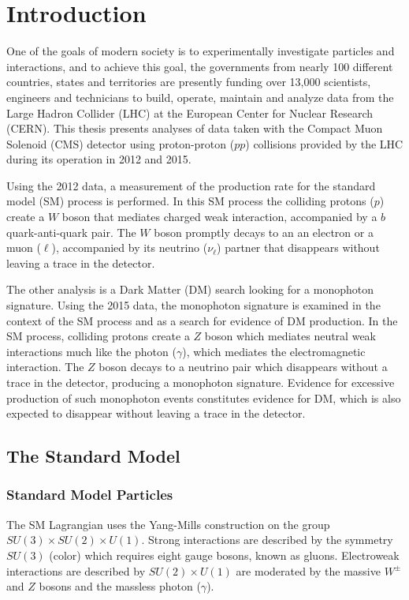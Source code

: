 
\chapter{Introduction}\label{sec:introduction}

 One of the goals of modern society is
  to experimentally investigate particles and
  interactions, and 
  to achieve this goal, the governments from 
  nearly 100 %
  different countries, states and territories are
  presently funding over 13,000 scientists, engineers 
  and technicians to build, operate, maintain 
  and analyze data from the
  Large Hadron Collider (LHC)
  at the European Center for Nuclear Research (CERN).
 This thesis presents analyses of data taken
  with the Compact Muon Solenoid (CMS) detector
  using proton-proton ($pp$) collisions provided by the LHC
  during its operation in 2012 and 2015.

 Using the 2012 data, a measurement of the
  production rate for the 
  standard model (SM) process \ppwbblnbb
  is performed. 
 In this SM process the colliding protons ($p$) create a
  $W$ boson that mediates charged weak interaction,
  accompanied by a $b$
  quark-anti-quark pair. 
 The $W$ boson promptly decays to an an electron
  or a muon ($\ell$), 
  accompanied by its neutrino ($\nu_\ell$) partner
  that disappears without leaving
  a trace in the detector.

 The other analysis is a Dark Matter (DM)
  search looking for a monophoton signature.
 Using the 2015 data,
  the monophoton signature is examined in the context
  of the SM process \ppzgnng  and as a search for evidence of
  DM production.
 In the SM process, colliding
  protons create a $Z$ boson which mediates
  neutral weak interactions much
  like the photon ($\gamma$), which mediates the
  electromagnetic interaction.  
 The $Z$ boson decays to a neutrino pair
  which disappears without a trace in
  the detector, producing a monophoton signature.
 Evidence for excessive production of such monophoton
  events constitutes evidence for DM,
  which is also expected to disappear without
  leaving a trace in the detector.

\section{The Standard Model}
\subsection{Standard Model Particles}
  The SM Lagrangian uses the
   Yang-Mills construction on the group
   $SU(3)\times SU(2)\times U(1)$.
  Strong interactions are described by the symmetry $SU(3)$ (color)
   which requires eight gauge bosons, known as gluons.
  Electroweak interactions are described by
   $SU(2)\times U(1)$ are moderated by the 
   massive $W^\pm$ and $Z$ bosons and the massless
   photon ($\gamma$).


